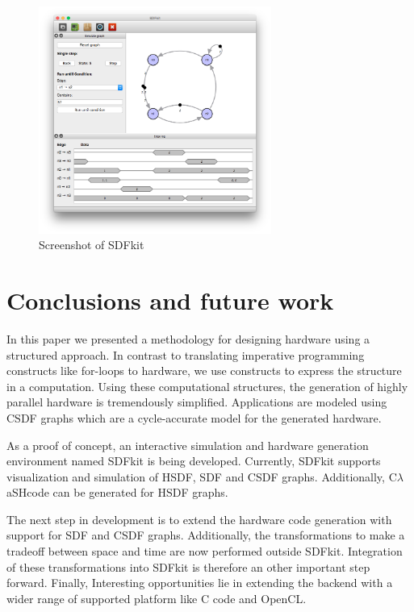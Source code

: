 \documentclass[journal]{IEEEtran}
\newcommand{\clash}{C$\lambda$aSH}
\begin{document}
  \begin{figure}[h!]
    \centering
    \includegraphics[width=3in]{screenshot.png}
    \caption{Screenshot of SDFkit}
    \label{fig:screenshot}
  \end{figure}



\section{Conclusions and future work}
\label{sec:conclusions}

  In this paper we presented a methodology for designing hardware using a structured approach.
  In contrast to translating imperative programming constructs like for-loops to hardware, we use constructs to express the structure in a computation.
  Using these computational structures, the generation of highly parallel hardware is tremendously simplified.
  Applications are modeled using CSDF graphs which are a cycle-accurate model for the generated hardware.

  As a proof of concept, an interactive simulation and hardware generation environment named SDFkit is being developed.
  Currently, SDFkit supports visualization and simulation of HSDF, SDF and CSDF graphs.
  Additionally, \clash code can be generated for HSDF graphs.

  The next step in development is to extend the hardware code generation with support for SDF and CSDF graphs.
  Additionally, the transformations to make a tradeoff between space and time are now performed outside SDFkit.
  Integration of these transformations into SDFkit is therefore an other important step forward.
  Finally, Interesting opportunities lie in extending the backend with a wider range of supported platform like C code and OpenCL.
  
\end{document}
